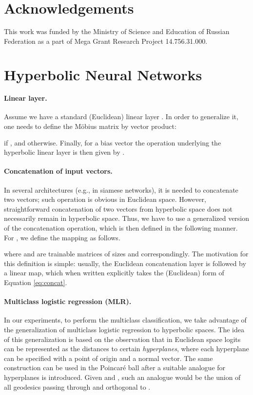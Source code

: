 \documentclass[10pt,twocolumn,letterpaper]{article}
\begin{document}
\section*{Acknowledgements} This work was funded by the Ministry of Science and Education of Russian Federation as a part of Mega Grant Research Project 14.756.31.000. 


\clearpage
\appendix
\section{Hyperbolic Neural Networks}{\label{app:hypnetworks}}













\paragraph{Linear layer.}
Assume we have a standard (Euclidean) linear layer . In order to generalize it, one needs to define the M\"obius matrix by vector product:

if , and   otherwise.
Finally, for a bias vector  the operation underlying the hyperbolic linear layer is then given by .

\paragraph{Concatenation of input vectors.}
In several architectures (e.g., in siamese networks), it is needed to concatenate two vectors; such operation is obvious in Euclidean space. However, straightforward concatenation of two vectors from hyperbolic space does not necessarily remain in hyperbolic space. Thus, we have to use a generalized version of the concatenation operation, which is then defined in the following manner. For ,  we define the mapping \mbox{} as follows.

where  and  are trainable matrices of sizes  and  correspondingly. The motivation for this definition is simple: usually, the Euclidean concatenation layer is followed by a linear map, which when written explicitly takes the (Euclidean) form of Equation \eqref{eq:concat}.

\paragraph{Multiclass logistic regression (MLR).} 
In our experiments, to perform the multiclass classification, we take advantage of the generalization of multiclass logistic regression to hyperbolic spaces. The idea of this generalization is based on the observation that in Euclidean space logits can be represented as the distances to certain \emph{hyperplanes}, where each hyperplane can be specified with a point of origin and a normal vector. The same construction can be used in the Poincar\'e ball after a suitable analogue for hyperplanes is introduced. Given  and , such an analogue would be the union of all geodesics passing through  and orthogonal to .
\end{document}
